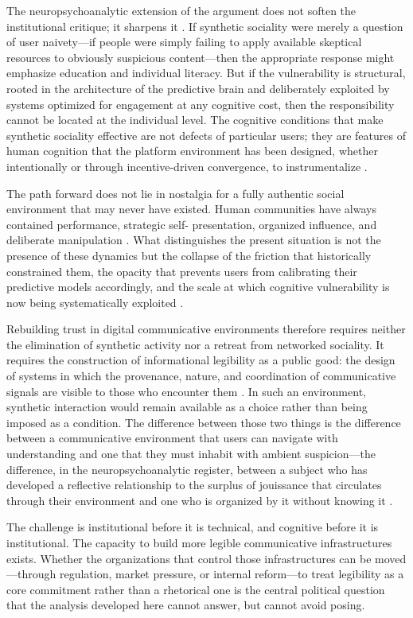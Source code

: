 \documentclass[12pt,a4paper]{article}
\begin{document}
The neuropsychoanalytic extension of the argument does not soften the institutional critique;
it sharpens it \citep{dallaglio2024}. If synthetic sociality were merely a question of user
naivety---if people were simply failing to apply available skeptical resources to obviously
suspicious content---then the appropriate response might emphasize education and individual
literacy. But if the vulnerability is structural, rooted in the architecture of the predictive
brain and deliberately exploited by systems optimized for engagement at any cognitive cost, then
the responsibility cannot be located at the individual level. The cognitive conditions that make
synthetic sociality effective are not defects of particular users; they are features of human
cognition that the platform environment has been designed, whether intentionally or through
incentive-driven convergence, to instrumentalize \citep{friston2010,zuboff2019}.

The path forward does not lie in nostalgia for a fully authentic social environment that may
never have existed. Human communities have always contained performance, strategic self-
presentation, organized influence, and deliberate manipulation \citep{debord1967}. What
distinguishes the present situation is not the presence of these dynamics but the collapse of
the friction that historically constrained them, the opacity that prevents users from calibrating
their predictive models accordingly, and the scale at which cognitive vulnerability is now being
systematically exploited \citep{vosoughi2018,dallaglio2024}.

Rebuilding trust in digital communicative environments therefore requires neither the elimination
of synthetic activity nor a retreat from networked sociality. It requires the construction of
informational legibility as a public good: the design of systems in which the provenance, nature,
and coordination of communicative signals are visible to those who encounter them
\citep{gillespie2018,noble2018}. In such an environment, synthetic interaction would remain
available as a choice rather than being imposed as a condition. The difference between those two
things is the difference between a communicative environment that users can navigate with
understanding and one that they must inhabit with ambient suspicion---the difference, in the
neuropsychoanalytic register, between a subject who has developed a reflective relationship to
the surplus of jouissance that circulates through their environment and one who is organized by
it without knowing it \citep{lacan2006,dallaglio2024}.

The challenge is institutional before it is technical, and cognitive before it is institutional.
The capacity to build more legible communicative infrastructures exists. Whether the
organizations that control those infrastructures can be moved---through regulation, market
pressure, or internal reform---to treat legibility as a core commitment rather than a rhetorical
one is the central political question that the analysis developed here cannot answer, but cannot
avoid posing.

\newpage


\end{document}
